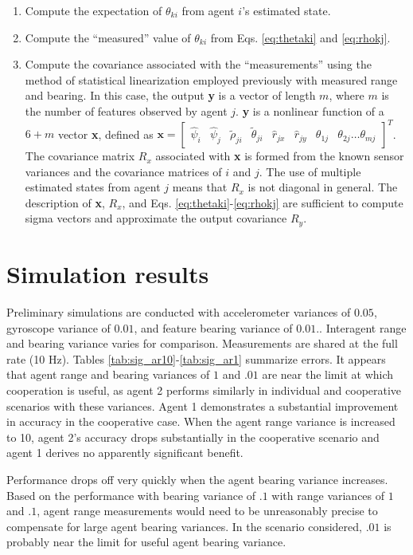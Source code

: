 \documentclass{aiaa-tc}
\newcommand{\B}[1]{\textbf{#1}} %
\begin{document}
\begin{enumerate}
\item Compute the expectation of $\theta_{ki}$ from agent $i$'s estimated state.
\item Compute the ``measured'' value of $\theta_{ki}$ from Eqs. \ref{eq:thetaki} and \ref{eq:rhokj}.
\item Compute the covariance associated with the ``measurements'' using the method of statistical linearization employed previously with measured range and bearing. In this case, the output \B{y} is a vector of length $m$, where $m$ is the number of features observed by agent $j$. \B{y} is a nonlinear function of a $6+m$ vector \B{x}, defined as $\B{x} = \begin{bmatrix}
\hat{\psi}_i & \hat{\psi}_j & \tilde{\rho}_{ji} & \tilde{\theta}_{ji} & \hat{r}_{jx} & \hat{r}_{jy} & \theta_{1j} & \theta_{2j} \dots \theta_{mj}
\end{bmatrix}^T$. The covariance matrix $R_x$ associated with \B{x} is formed from the known sensor variances and the covariance matrices of $i$ and $j$. The use of multiple estimated states from agent $j$ means that $R_x$ is not diagonal in general. The description of \B{x}, $R_x$, and Eqs. \ref{eq:thetaki}-\ref{eq:rhokj} are sufficient to compute sigma vectors and approximate the output covariance $R_y$.
\end{enumerate}

\section{Simulation results}

Preliminary simulations are conducted with accelerometer variances of $0.05$, gyroscope variance of $0.01$, and feature bearing variance of $0.01$.. Interagent range and bearing variance varies for comparison. Measurements are shared at the full rate (10 Hz). Tables \ref{tab:sig_ar10}-\ref{tab:sig_ar1} summarize errors. It appears that agent range and bearing variances of $1$ and $.01$ are near the limit at which cooperation is useful, as agent 2 performs similarly in individual and cooperative scenarios with these variances. Agent 1 demonstrates a substantial improvement in accuracy in the cooperative case. When the agent range variance is increased to 10, agent 2's accuracy drops substantially in the cooperative scenario and agent 1 derives no apparently significant benefit. 

Performance drops off very quickly when the agent bearing variance increases. Based on the performance with bearing variance of $.1$ with range variances of $1$ and $.1$, agent range measurements would need to be unreasonably precise to compensate for large agent bearing variances. In the scenario considered, $.01$ is probably near the limit for useful agent bearing variance.
\end{document}
